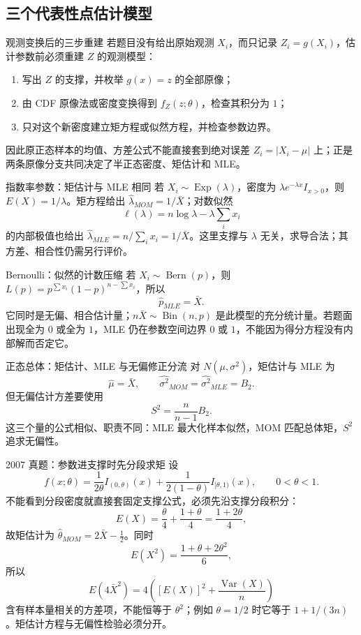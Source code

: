 \documentclass[11pt,a4paper]{ctexart}
\begin{document}
\subsection{三个代表性点估计模型}

\begin{methodbox}{观测变换后的三步重建}
若题目没有给出原始观测 $X_i$，而只记录 $Z_i=g(X_i)$，估计参数前必须重建 $Z$ 的观测模型：
\begin{enumerate}
  \item 写出 $Z$ 的支撑，并枚举 $g(x)=z$ 的全部原像；
  \item 由 CDF 原像法或密度变换得到 $f_Z(z;\theta)$，检查其积分为 $1$；
  \item 只对这个新密度建立矩方程或似然方程，并检查参数边界。
\end{enumerate}
因此原正态样本的均值、方差公式不能直接套到绝对误差 $Z_i=\lvert X_i-\mu\rvert$ 上；正是两条原像分支共同决定了半正态密度、矩估计和 MLE。
\end{methodbox}

\begin{methodbox}{指数率参数：矩估计与 MLE 相同}
若 $X_i\sim\operatorname{Exp}(\lambda)$，密度为 $\lambda e^{-\lambda x}I_{x>0}$，则 $E(X)=1/\lambda$。矩方程给出 $\widehat\lambda_{MOM}=1/\bar X$；对数似然
\[
\ell(\lambda)=n\log\lambda-\lambda\sum_i x_i
\]
的内部极值也给出 $\widehat\lambda_{MLE}=n/\sum_i x_i=1/\bar X$。这里支撑与 $\lambda$ 无关，求导合法；其方差、相合性仍需另行评价。
\end{methodbox}

\begin{methodbox}{Bernoulli：似然的计数压缩}
若 $X_i\sim\operatorname{Bern}(p)$，则 $L(p)=p^{\sum x_i}(1-p)^{n-\sum x_i}$，所以
\[
\widehat p_{MLE}=\bar X.
\]
它同时是无偏、相合估计量；$n\bar X\sim\operatorname{Bin}(n,p)$ 是此模型的充分统计量。若题面出现全为 $0$ 或全为 $1$，MLE 仍在参数空间边界 $0$ 或 $1$，不能因为得分方程没有内部解而否定它。
\end{methodbox}

\begin{methodbox}{正态总体：矩估计、MLE 与无偏修正分流}
对 $N(\mu,\sigma^2)$，矩估计与 MLE 为
\[
\widehat\mu=\bar X,\qquad \widehat{\sigma^2}_{MOM}=\widehat{\sigma^2}_{MLE}=B_2.
\]
但无偏估计方差要使用
\[
S^2=\frac n{n-1}B_2.
\]
这三个量的公式相似、职责不同：MLE 最大化样本似然，MOM 匹配总体矩，$S^2$ 追求无偏性。
\end{methodbox}

\begin{examplebox}{2007 真题：参数进支撑时先分段求矩}
设
\[
f(x;\theta)=\frac1{2\theta}I_{(0,\theta)}(x)
 +\frac1{2(1-\theta)}I_{[\theta,1)}(x),
\qquad 0<\theta<1.
\]
不能看到分段密度就直接套固定支撑公式，必须先沿支撑分段积分：
\[
E(X)=\frac{\theta}{4}+\frac{1+\theta}{4}=\frac{1+2\theta}{4},
\]
故矩估计为 $\widehat\theta_{MOM}=2\bar X-\frac12$。同时
\[
E(X^2)=\frac{1+\theta+2\theta^2}{6},
\]
所以
\[
E(4\bar X^2)=4\left([E(X)]^2+\frac{\operatorname{Var}(X)}n\right)
\]
含有样本量相关的方差项，不能恒等于 $\theta^2$；例如 $\theta=1/2$ 时它等于 $1+1/(3n)$。矩估计方程与无偏性检验必须分开。
\end{examplebox}
\end{document}
